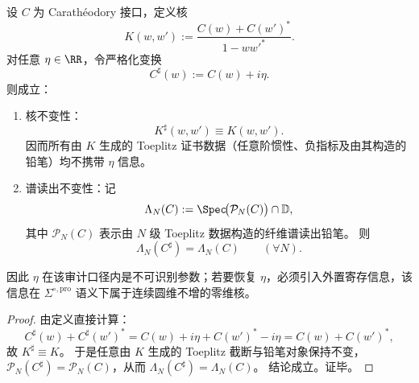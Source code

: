 \begin{conclusion}\label{con:xi-counterterm-unobservability-zero-dimensional-ledger-necessity}
设 \(C\) 为 Carath\'eodory 接口，定义核
\[
K(w,w'):=\frac{C(w)+C(w')^\ast}{1-ww'^\ast}.
\]
对任意 \(\eta\in\RR\)，令严格化变换
\[
C^\sharp(w):=C(w)+i\eta.
\]
则成立：
\begin{enumerate}
  \item \textnormal{核不变性：}
  \[
  K^\sharp(w,w')\equiv K(w,w').
  \]
  因而所有由 \(K\) 生成的 Toeplitz 证书数据（任意阶惯性、负指标及由其构造的铅笔）均不携带 \(\eta\) 信息。
  \item \textnormal{谱读出不变性：}记
  \[
  \Lambda_N(C):=\Spec\!\bigl(\mathcal P_N(C)\bigr)\cap\mathbb D,
  \]
  其中 \(\mathcal P_N(C)\) 表示由 \(N\) 级 Toeplitz 数据构造的纤维谱读出铅笔。
  则
  \[
  \Lambda_N(C^\sharp)=\Lambda_N(C)\qquad(\forall N).
  \]
\end{enumerate}
因此 \(\eta\) 在该审计口径内是不可识别参数；若要恢复 \(\eta\)，必须引入外置寄存信息，该信息在 \(\Sigma^{\circ,\mathrm{pro}}\) 语义下属于连续圆维不增的零维核。
\end{conclusion}
\begin{proof}
由定义直接计算：
\[
C^\sharp(w)+C^\sharp(w')^\ast
=C(w)+i\eta+C(w')^\ast-i\eta
=C(w)+C(w')^\ast,
\]
故 \(K^\sharp\equiv K\)。
于是任意由 \(K\) 生成的 Toeplitz 截断与铅笔对象保持不变，\(\mathcal P_N(C^\sharp)=\mathcal P_N(C)\)，从而
\(
\Lambda_N(C^\sharp)=\Lambda_N(C)
\)。
结论成立。证毕。
\end{proof}

